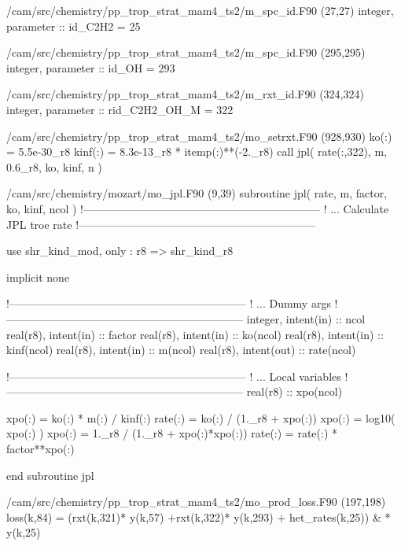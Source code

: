 \documentclass[titlepage]{article}
\begin{document}
\begin{blockcode}[commandchars=\\\{\}]
\color{gray}/cam/src/chemistry/pp_trop_strat_mam4_ts2/m_spc_id.F90 (27,27)
      integer, parameter :: id_C2H2 = 25
\end{blockcode}
\begin{blockcode}[commandchars=\\\{\}]
\color{gray}/cam/src/chemistry/pp_trop_strat_mam4_ts2/m_spc_id.F90 (295,295)
      integer, parameter :: id_OH = 293
\end{blockcode}
\begin{blockcode}[commandchars=\\\{\}]
\color{gray}/cam/src/chemistry/pp_trop_strat_mam4_ts2/m_rxt_id.F90 (324,324)
      integer, parameter :: rid_C2H2_OH_M = 322
\end{blockcode}
\begin{blockcode}[commandchars=\\\{\}]
\color{gray}/cam/src/chemistry/pp_trop_strat_mam4_ts2/mo_setrxt.F90 (928,930)
      ko(:) = 5.5e-30_r8
      kinf(:) = 8.3e-13_r8 * itemp(:)**(-2._r8)
      call jpl( rate(:,322), m, 0.6_r8, ko, kinf, n )
\end{blockcode}
\begin{blockcode}[commandchars=\\\{\}]
\color{gray}/cam/src/chemistry/mozart/mo_jpl.F90 (9,39)
      subroutine jpl( rate, m, factor, ko, kinf, ncol )
!-----------------------------------------------------------------
!        ... Calculate JPL troe rate
!-----------------------------------------------------------------

      use shr_kind_mod, only : r8 => shr_kind_r8

      implicit none

!-----------------------------------------------------------------
!        ... Dummy args
!-----------------------------------------------------------------
      integer, intent(in)   ::   ncol
      real(r8), intent(in)  ::   factor
      real(r8), intent(in)  ::   ko(ncol)
      real(r8), intent(in)  ::   kinf(ncol)
      real(r8), intent(in)  ::   m(ncol)
      real(r8), intent(out) ::   rate(ncol)

!-----------------------------------------------------------------
!        ... Local variables
!-----------------------------------------------------------------
      real(r8)  ::  xpo(ncol)

      xpo(:)  = ko(:) * m(:) / kinf(:)
      rate(:) = ko(:) / (1._r8 + xpo(:))
      xpo(:)  = log10( xpo(:) )
      xpo(:)  = 1._r8 / (1._r8 + xpo(:)*xpo(:))
      rate(:) = rate(:) * factor**xpo(:)

      end subroutine jpl
\end{blockcode}
\begin{blockcode}[commandchars=\\\{\}]
\color{gray}/cam/src/chemistry/pp_trop_strat_mam4_ts2/mo_prod_loss.F90 (197,198)
         loss(k,84) = (rxt(k,321)* y(k,57) +rxt(k,322)* y(k,293) + het_rates(k,25)) &
                 * y(k,25)
\end{blockcode}
\end{document}
